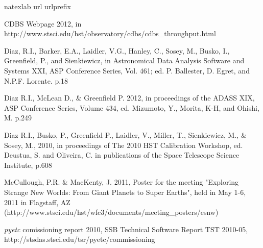 \documentclass[11pt,twoside]{article}
\begin{document}
\begin{thebibliography}{}
\expandafter\ifx\csname natexlab\endcsname\relax\def\natexlab#1{#1}\fi
\expandafter\ifx\csname url\endcsname\relax
  \def\url#1{\texttt{#1}}\fi
\expandafter\ifx\csname urlprefix\endcsname\relax\def\urlprefix{URL }\fi
\providecommand{\eprint}[2][]{\url{#2}}

CDBS Webpage 2012, in http://www.stsci.edu/hst/observatory/cdbs/cdbs\_throughput.html

Diaz, R.I., Barker, E.A., Laidler, V.G., Hanley,  C., Sosey, M., Busko, I., Greenfield, P., and Sienkiewicz, in Astronomical Data Analysis Software and Systems XXI, ASP Conference Series, Vol. 461; ed. P. Ballester, D. Egret, and N.P.F. Lorente. p.18

Diaz R.I., McLean D., \& Greenfield P. 2012, in proceedings of the ADASS XIX, ASP Conference Series, Volume 434, ed. Mizumoto, Y., Morita, K-H, and Ohishi, M. p.249


Diaz R.I., Busko, P., Greenfield P.,
Laidler, V., Miller, T., Sienkiewicz, M., \& Sosey, M., 2010, in proceedings of The 2010 HST Calibration Workshop, ed. Deustua, S. and Oliveira, C. in publications of the Space Telescope Science Institute, p.608

McCullough, P.R. \& MacKenty, J. 2011, Poster for the meeting "Exploring Strange New Worlds: From Giant Planets to Super Earths", held in May 1-6, 2011 in Flagstaff, AZ (http://www.stsci.edu/hst/wfc3/documents/meeting\_posters/esnw)

{\it pyetc}  comissioning report 2010, SSB Technical Software Report TST 2010-05, http://stsdas.stsci.edu/tsr/pyetc/commissioning

\end{thebibliography}
\end{document}
